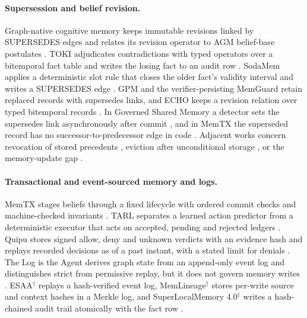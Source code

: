 \paragraph{Supersession and belief revision.} Graph-native cognitive memory keeps immutable revisions linked by SUPERSEDES edges and relates its revision operator to AGM belief-base postulates \citep{arxiv_2603_17244}. TOKI adjudicates contradictions with typed operators over a bitemporal fact table and writes the losing fact to an audit row \citep{arxiv_2606_06240}. SodaMem applies a deterministic slot rule that closes the older fact's validity interval and writes a SUPERSEDES edge \citep{arxiv_2608_08055}. GPM and the verifier-persisting MemGuard retain replaced records with supersedes links, and ECHO keeps a revision relation over typed bitemporal records \citep{arxiv_2608_12476,arxiv_2608_21867,arxiv_2608_21755}. In Governed Shared Memory a detector sets the supersedes link asynchronously after commit \citep{arxiv_2606_24535}, and in MemTX the superseded record has no successor-to-predecessor edge in code \citep{arxiv_2607_23929}. Adjacent works concern revocation of stored precedents \citep{arxiv_2608_07429}, eviction after unconditional storage \citep{arxiv_2606_03463}, or the memory-update gap \citep{arxiv_2606_27472}.

\paragraph{Transactional and event-sourced memory and logs.} MemTX stages beliefs through a fixed lifecycle with ordered commit checks and machine-checked invariants \citep{arxiv_2607_23929}. TARL separates a learned action predictor from a deterministic executor that acts on accepted, pending and rejected ledgers \citep{arxiv_2608_03699}. Quipu stores signed allow, deny and unknown verdicts with an evidence hash and replays recorded decisions as of a past instant, with a stated limit for denials \citep{arxiv_2608_16813}. The Log is the Agent derives graph state from an append-only event log and distinguishes strict from permissive replay, but it does not govern memory writes \citep{arxiv_2605_21997}. ESAA$^{\dagger}$ replays a hash-verified event log, MemLineage$^{\dagger}$ stores per-write source and context hashes in a Merkle log, and SuperLocalMemory 4.0$^{\dagger}$ writes a hash-chained audit trail atomically with the fact row \citep{arxiv_2602_23193,arxiv_2605_14421,arxiv_2608_08253}.

